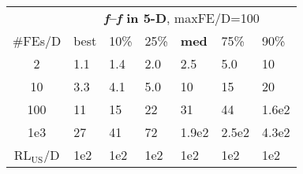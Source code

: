 \begin{tabular}{c|llllll}
 & \multicolumn{6}{|c}{\textbf{\textit{f}\raisebox{-0.35ex}{1}--\textit{f}\raisebox{-0.35ex}{24} in 5-D}, maxFE/D=100}\\
\#FEs/D & best & 10\% & 25\% & \textbf{med} & 75\% & 90\%\\
2 & \hspace*{1ex}1.1 & \hspace*{1ex}1.4 & \hspace*{1ex}2.0 & \hspace*{1ex}2.5 & \hspace*{1ex}5.0 & 10\\
10 & \hspace*{1ex}3.3 & \hspace*{1ex}4.1 & \hspace*{1ex}5.0 & 10 & 15 & 20\\
100 & 11 & 15 & 22 & 31 & 44 & 1.6e2\\
1e3 & 27 & 41 & 72 & 1.9e2 & 2.5e2 & 4.3e2\\
$\text{RL}_{\text{US}}$/D & 1e2 & 1e2 & 1e2 & 1e2 & 1e2 & 1e2
\end{tabular}
